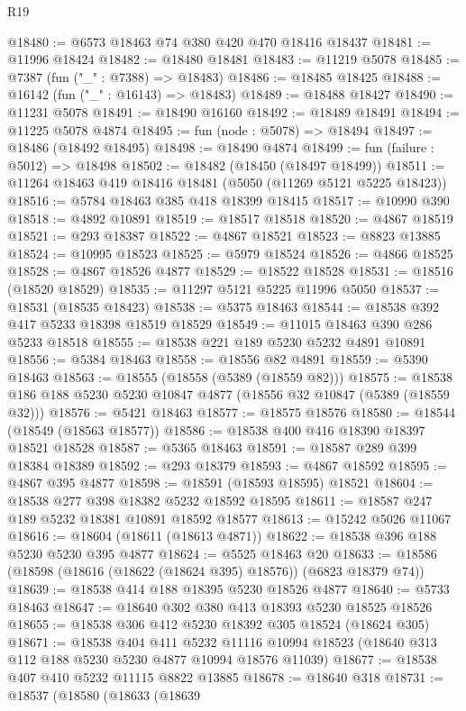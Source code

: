 \begin{lexlean}{R19}
\begin{coremodule}
@18480 := @6573 @18463 @74 @380 @420 @470 @18416 @18437
@18481 := @11996 @18424
@18482 := @18480 @18481
@18483 := @11219 @5078
@18485 := @7387 (fun ("_" : @7388) => @18483)
@18486 := @18485 @18425
@18488 := @16142 (fun ("_" : @16143) => @18483)
@18489 := @18488 @18427
@18490 := @11231 @5078
@18491 := @18490 @16160
@18492 := @18489 @18491
@18494 := @11225 @5078 @4874
@18495 := fun (node : @5078) => @18494
@18497 := @18486 (@18492 @18495)
@18498 := @18490 @4874
@18499 := fun (failure : @5012) => @18498
@18502 := @18482 (@18450 (@18497 @18499))
@18511 := @11264 @18463 @419 @18416 @18481 (@5050 (@11269 @5121 @5225 @18423))
@18516 := @5784 @18463 @385 @418 @18399 @18415
@18517 := @10990 @390
@18518 := @4892 @10891
@18519 := @18517 @18518
@18520 := @4867 @18519
@18521 := @293 @18387
@18522 := @4867 @18521
@18523 := @8823 @13885
@18524 := @10995 @18523
@18525 := @5979 @18524
@18526 := @4866 @18525
@18528 := @4867 @18526 @4877
@18529 := @18522 @18528
@18531 := @18516 (@18520 @18529)
@18535 := @11297 @5121 @5225 @11996 @5050
@18537 := @18531 (@18535 @18423)
@18538 := @5375 @18463
@18544 := @18538 @392 @417 @5233 @18398 @18519 @18529
@18549 := @11015 @18463 @390 @286 @5233 @18518
@18555 := @18538 @221 @189 @5230 @5232 @4891 @10891
@18556 := @5384 @18463
@18558 := @18556 @82 @4891
@18559 := @5390 @18463
@18563 := @18555 (@18558 (@5389 (@18559 @82)))
@18575 := @18538 @186 @188 @5230 @5230 @10847 @4877 (@18556 @32 @10847 (@5389 (@18559 @32)))
@18576 := @5421 @18463
@18577 := @18575 @18576
@18580 := @18544 (@18549 (@18563 @18577))
@18586 := @18538 @400 @416 @18390 @18397 @18521 @18528
@18587 := @5365 @18463
@18591 := @18587 @289 @399 @18384 @18389
@18592 := @293 @18379
@18593 := @4867 @18592
@18595 := @4867 @395 @4877
@18598 := @18591 (@18593 @18595) @18521
@18604 := @18538 @277 @398 @18382 @5232 @18592 @18595
@18611 := @18587 @247 @189 @5232 @18381 @10891 @18592 @18577
@18613 := @15242 @5026 @11067
@18616 := @18604 (@18611 (@18613 @4871))
@18622 := @18538 @396 @188 @5230 @5230 @395 @4877
@18624 := @5525 @18463 @20
@18633 := @18586 (@18598 (@18616 (@18622 (@18624 @395) @18576)) (@6823 @18379 @74))
@18639 := @18538 @414 @188 @18395 @5230 @18526 @4877
@18640 := @5733 @18463
@18647 := @18640 @302 @380 @413 @18393 @5230 @18525 @18526
@18655 := @18538 @306 @412 @5230 @18392 @305 @18524 (@18624 @305)
@18671 := @18538
    @404
    @411
    @5232
    @11116
    @10994
    @18523
    (@18640 @313 @112 @188 @5230 @5230 @4877 @10994 @18576 @11039)
@18677 := @18538 @407 @410 @5232 @11115 @8822 @13885
@18678 := @18640 @318
@18731 := @18537
    (@18580
      (@18633
        (@18639

\end{coremodule}
\end{lexlean}
